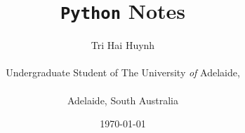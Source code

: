 \usepackage[ruled,titlenotnumbered]{algorithm2e}
\NoCaptionOfAlgo
\SetAlgoCaptionSeparator{}
\SetAlCapNameFnt{\large\scshape}
\DontPrintSemicolon
\SetAlgoLongEnd
{}
\usepackage{caption}
\newcommand{\boxit}[3]{
    \tikz[remember picture,overlay] \node (A) {};\ignorespaces
    \tikz[remember picture,overlay]{
            \node[yshift=3pt,fill=#1,opacity=.25,
            fit={ ($(A)+(-0.1,0.3\baselineskip)$) ($(A)+(#2\textwidth,-{#3}\baselineskip - 0.25\baselineskip)$) } ] {};
        }\ignorespaces
}
\newcommand\mycommfont[1]{\footnotesize\ttfamily\itshape #1\unskip}
\setlength{\algomargin}{2em}
\setlength{\interspacetitleruled}{6pt}
\setlength\algoheightrule{1.5pt}


\title{\texttt{Python} Notes}   
\date{\today}
\author{Tri Hai Huynh \\ \\
        Undergraduate Student of The University \emph{of} Adelaide, \\ \\
        Adelaide, South Australia}
